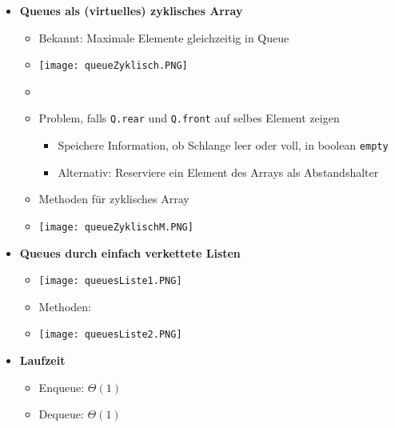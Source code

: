 \begin{itemize}
        \item \textbf{Queues als (virtuelles) zyklisches Array}
            \begin{itemize}
                \item[] Bekannt: Maximale Elemente gleichzeitig in Queue
                \item[] \texttt{[image: queueZyklisch.PNG]} 
                \item[] 
                \item Problem, falls \texttt{Q.rear} und \texttt{Q.front} auf selbes Element zeigen 
                    \begin{itemize}
                        \item Speichere Information, ob Schlange leer oder voll, in boolean \texttt{empty}
                        \item Alternativ: Reserviere ein Element des Arrays als Abstandshalter
                    \end{itemize}
                
                \item Methoden für zyklisches Array
                \item[] \texttt{[image: queueZyklischM.PNG]}
            \end{itemize}

        \item \textbf{Queues durch einfach verkettete Listen}
            \begin{itemize}
                \item[] \texttt{[image: queuesListe1.PNG]}
                \item[] Methoden:
                \item[] \texttt{[image: queuesListe2.PNG]} 
            \end{itemize}

        \item \textbf{Laufzeit}
            \begin{itemize}
                \item Enqueue: $\Theta(1)$
                \item Dequeue: $\Theta(1)$
            \end{itemize}
    \end{itemize}

\pagebreak

